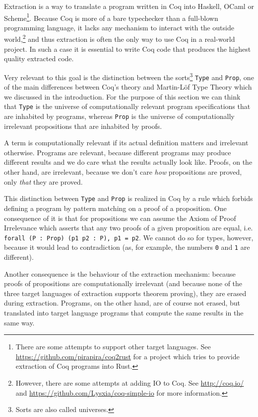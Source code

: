 \documentclass[declaration,mgr,english,shortabstract]{iithesis}
\newcommand{\m}[1]{\texttt{#1}}
\begin{document}
Extraction is a way to translate a program written in Coq into Haskell, OCaml or Scheme\footnote{There are some attempts to support other target languages. See \url{https://github.com/pirapira/coq2rust} for a project which tries to provide extraction of Coq programs into Rust.}. Because Coq is more of a bare typechecker than a full-blown programming language, it lacks any mechanism to interact with the outside world,\footnote{However, there are some attempts at adding IO to Coq. See \url{http://coq.io/} and \url{https://github.com/Lysxia/coq-simple-io} for more information.} and thus extraction is often the only way to use Coq in a real-world project. In such a case it is essential to write Coq code that produces the highest quality extracted code.

Very relevant to this goal is the distinction between the sorts\footnote{Sorts are also called universes.} \m{Type} and \m{Prop}, one of the main differences between Coq's theory and Martin-L\"{o}f Type Theory which we discussed in the introduction. For the purpose of this section we can think that \m{Type} is the universe of computationally relevant program specifications that are inhabited by programs, whereas \m{Prop} is the universe of computationally irrelevant propositions that are inhabited by proofs.

A term is computationally relevant if its actual definition matters and irrelevant otherwise. Programs are relevant, because different programs may produce different results and we do care what the results actually look like. Proofs, on the other hand, are irrelevant, because we don't care \textit{how} propositions are proved, only \textit{that} they are proved.

This distinction between \m{Type} and \m{Prop} is realized in Coq by a rule which forbids defining a program by pattern matching on a proof of a proposition. One consequence of it is that for propositions we can assume the Axiom of Proof Irrelevance which asserts that any two proofs of a given proposition are equal, i.e. \m{forall (P\ :\ Prop) (p1 p2\ :\ P), p1 = p2}. We cannot do so for types, however, because it would lead to contradiction (as, for example, the numbers \m{0} and \m{1} are different).

Another consequence is the behaviour of the extraction mechanism: because proofs of propositions are computationally irrelevant (and because none of the three target languages of extraction supports theorem proving), they are erased during extraction. Programs, on the other hand, are of course not erased, but translated into target language programs that compute the same results in the same way.
\end{document}
